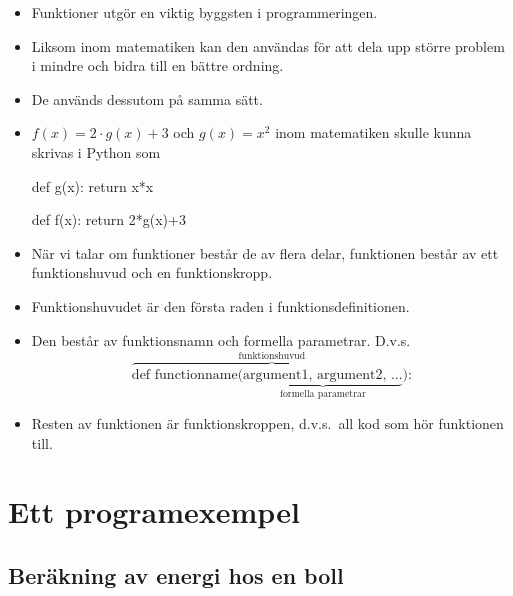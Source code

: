 \documentclass{beamer}
\begin{document}
\begin{frame}[fragile]{\insertsubsectionhead}
  \begin{itemize}
    \item Funktioner utgör en viktig byggsten i programmeringen.

    \item Liksom inom matematiken kan den användas för att dela upp större 
      problem i mindre och bidra till en bättre ordning.

    \item De används dessutom på samma sätt.

    \item \(f(x) = 2 \cdot g(x) + 3\) och \(g(x) = x^2\) inom matematiken 
      skulle kunna skrivas i Python som
      \begin{src}[language=python]
def g(x):
    return x*x

def f(x):
    return 2*g(x)+3
      \end{src}

  \end{itemize}
\end{frame}

\begin{frame}{\insertsubsectionhead}
  \begin{itemize}
    \item När vi talar om funktioner består de av flera delar, funktionen 
      består av ett funktionshuvud och en funktionskropp.

    \item Funktionshuvudet är den första raden i funktionsdefinitionen.

    \item Den består av funktionsnamn och formella parametrar.
      D.v.s. \[
        \overbrace{\text{def functionname(}
          \underbrace{\text{argument1, argument2, ...}}_{\text{formella
            parametrar}}\text{):}}^{\text{funktionshuvud}}
      \]

    \item Resten av funktionen är funktionskroppen, d.v.s.\ all kod som hör 
      funktionen till.
  \end{itemize}
\end{frame}


\section{Ett programexempel}

\subsection{Beräkning av energi hos en boll}
\end{document}
